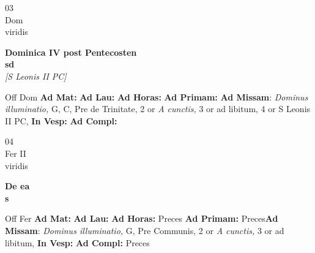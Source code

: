 \documentclass[10pt, openany]{book}
\begin{document}
        \begin{center}
            \begin{minipage}{3.5in}
                \vspace{2em}
                \begin{minipage}{0.5in}
                    {\Huge 03} \\
                    {\normalsize Dom} \\
                    {\normalsize viridis}
                \end{minipage}
                \begin{minipage}{3.0in}
                    \textbf{ \large Dominica IV post Pentecosten \\
                    \textnormal{\normalsize sd}} \\ \textit{[S Leonis II PC]} \\ 
                \end{minipage}
                \begin{justify}Off Dom
                    \textbf{Ad Mat: }
                    \textbf{Ad Lau: }
                    \textbf{Ad Horas: }
                    \textbf{Ad Primam: }\textbf{Ad Missam}: \textit{Dominus illuminatio,} G, C, Pre de Trinitate, 2 or \textit{A cunctis,} 3 or ad libitum, 4 or S Leonis II PC,  
                    \textbf{In Vesp: }
                    \textbf{Ad Compl: }
                \end{justify}
            \end{minipage}
        \end{center}
    
        \begin{center}
            \begin{minipage}{3.5in}
                \vspace{2em}
                \begin{minipage}{0.5in}
                    {\Huge 04} \\
                    {\normalsize Fer II} \\
                    {\normalsize viridis}
                \end{minipage}
                \begin{minipage}{3.0in}
                    \textbf{ \large De ea \\
                    \textnormal{\normalsize s}} \\ 
                \end{minipage}
                \begin{justify}Off Fer
                    \textbf{Ad Mat: }
                    \textbf{Ad Lau: }
                    \textbf{Ad Horas: }Preces
                    \textbf{Ad Primam: }Preces\textbf{Ad Missam}: \textit{Dominus illuminatio,} G, Pre Communis, 2 or \textit{A cunctis,} 3 or ad libitum,  
                    \textbf{In Vesp: }
                    \textbf{Ad Compl: }Preces
                \end{justify}
            \end{minipage}
        \end{center}
    
\end{document}
